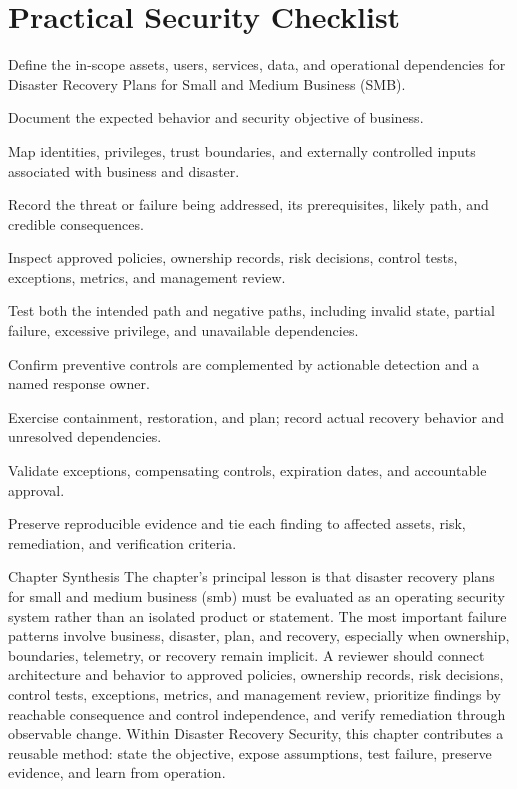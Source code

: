 \documentclass[11pt,letterpaper]{article}
\begin{document}
\section*{Practical Security Checklist}
\begin{CornellChecklist}
\item Define the in-scope assets, users, services, data, and operational dependencies for Disaster Recovery Plans for Small and Medium Business (SMB).
\item Document the expected behavior and security objective of business.
\item Map identities, privileges, trust boundaries, and externally controlled inputs associated with business and disaster.
\item Record the threat or failure being addressed, its prerequisites, likely path, and credible consequences.
\item Inspect approved policies, ownership records, risk decisions, control tests, exceptions, metrics, and management review.
\item Test both the intended path and negative paths, including invalid state, partial failure, excessive privilege, and unavailable dependencies.
\item Confirm preventive controls are complemented by actionable detection and a named response owner.
\item Exercise containment, restoration, and plan; record actual recovery behavior and unresolved dependencies.
\item Validate exceptions, compensating controls, expiration dates, and accountable approval.
\item Preserve reproducible evidence and tie each finding to affected assets, risk, remediation, and verification criteria.
\end{CornellChecklist}
\begin{CornellSummaryBox}{Chapter Synthesis}
The chapter's principal lesson is that disaster recovery plans for small and medium business (smb) must be evaluated as an operating security system rather than an isolated product or statement. The most important failure patterns involve business, disaster, plan, and recovery, especially when ownership, boundaries, telemetry, or recovery remain implicit. A reviewer should connect architecture and behavior to approved policies, ownership records, risk decisions, control tests, exceptions, metrics, and management review, prioritize findings by reachable consequence and control independence, and verify remediation through observable change. Within Disaster Recovery Security, this chapter contributes a reusable method: state the objective, expose assumptions, test failure, preserve evidence, and learn from operation.
\end{CornellSummaryBox}
\end{document}
